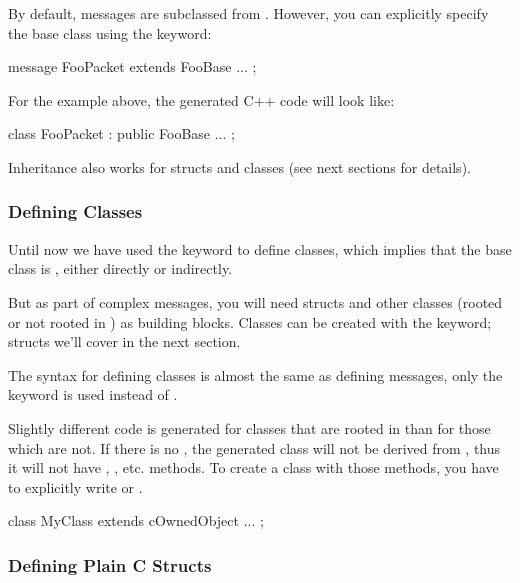 By default, messages are subclassed from . However, you can
explicitly specify the base class using the  keyword:

\begin{msg}
message FooPacket extends FooBase
{
    ...
};
\end{msg}

For the example above, the generated C++ code will look like:

\begin{cpp}
class FooPacket : public FooBase { ... };
\end{cpp}

Inheritance also works for structs and classes (see next sections
for details).



\subsubsection{Defining Classes}

Until now we have used the  keyword to define classes, which
implies that the base class is , either directly or indirectly.

But as part of complex messages, you will need structs and other classes
(rooted or not rooted in ) as building blocks.
Classes can be created with the  keyword;
structs we'll cover in the next section.

The syntax for defining classes is almost the same as defining messages,
only the  keyword is used instead of .

Slightly different code is generated for classes that are rooted in
 than for those which are not.
If there is no , the generated class will not be
derived from , thus it will not have ,
, etc. methods.
To create a class with those methods, you have to explicitly write
 or .

\begin{msg}
class MyClass extends cOwnedObject
{
    ...
};
\end{msg}



\subsubsection{Defining Plain C Structs}

